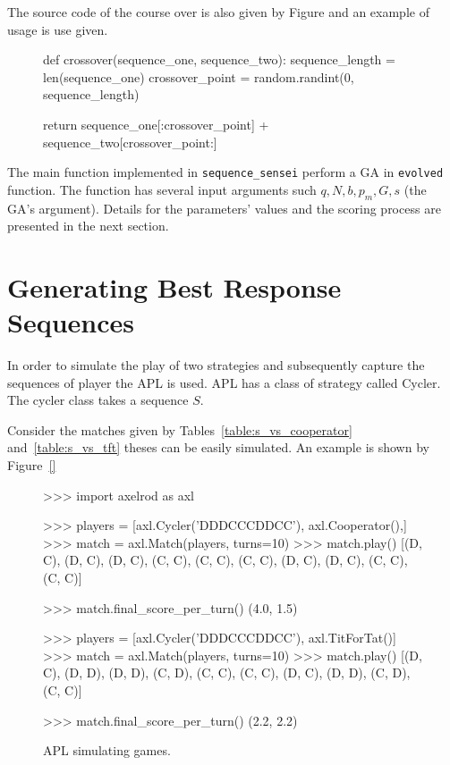 The source code of the course over is also given by Figure and an example
of usage is use given.

\begin{figure}[!htbp]
\begin{sourcepy}
def crossover(sequence_one, sequence_two):
    sequence_length = len(sequence_one)
    crossover_point = random.randint(0, sequence_length)

    return sequence_one[:crossover_point] + sequence_two[crossover_point:]
\end{sourcepy}
\end{figure}

The main function implemented in \texttt{sequence_sensei} perform a
GA in \texttt{evolved} function. The function has several input
arguments such \(q, N, b, p_m, G, s\) (the GA's argument). Details for the
parameters' values and the scoring process are presented in the next section.

\section{Generating Best Response Sequences}\label{section:generating_sequences}

In order to simulate the play of two strategies and subsequently capture the
sequences of player the APL is used. APL has a class of strategy called
Cycler. The cycler class takes a sequence \(S\).

Consider the matches given by Tables~\ref{table:s_vs_cooperator} and~\ref{table:s_vs_tft}
theses can be easily simulated. An example
is shown by Figure~\ref{}

\begin{figure}[!htbp]
    \begin{usagepy}
>>> import axelrod as axl

>>> players = [axl.Cycler('DDDCCCDDCC'), axl.Cooperator(),]
>>> match = axl.Match(players, turns=10)
>>> match.play()
[(D, C),
 (D, C),
 (D, C),
 (C, C),
 (C, C),
 (C, C),
 (D, C),
 (D, C),
 (C, C),
 (C, C)]

>>> match.final_score_per_turn()
(4.0, 1.5)

>>> players = [axl.Cycler('DDDCCCDDCC'), axl.TitForTat()]
>>> match = axl.Match(players, turns=10)
>>> match.play()
[(D, C),
 (D, D),
 (D, D),
 (C, D),
 (C, C),
 (C, C),
 (D, C),
 (D, D),
 (C, D),
 (C, C)]

 >>> match.final_score_per_turn()
 (2.2, 2.2)
    \end{usagepy}
\caption{APL simulating games.}
\end{figure}


